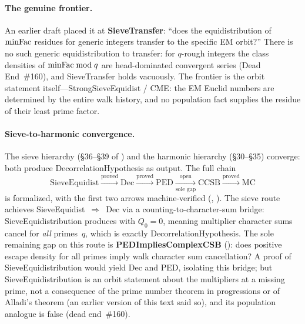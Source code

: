 \paragraph{The genuine frontier.}

An earlier draft placed it at \textbf{SieveTransfer}: ``does the
equidistribution of $\mathrm{minFac}$ residues for generic integers transfer
to the specific EM orbit?''  There is no such generic
equidistribution to transfer: for $q$-rough integers the class
densities of $\mathrm{minFac} \bmod q$ are head-dominated convergent series
(Dead End~\#160), and SieveTransfer holds vacuously.  The frontier is
the orbit statement itself---StrongSieveEquidist / CME: the EM Euclid
numbers are determined by the entire walk history, and no population
fact supplies the residue of their least prime factor.

\paragraph{Sieve-to-harmonic convergence.}

The sieve hierarchy (\S36--\S39 of )
and the harmonic hierarchy (\S30--\S35) converge: both produce
DecorrelationHypothesis as output.  The full chain
\[
\mathrm{SieveEquidist}
\xrightarrow{\text{proved}}
\mathrm{Dec}
\xrightarrow{\text{proved}}
\mathrm{PED}
\xrightarrow[\text{sole gap}]{\text{open}}
\mathrm{CCSB}
\xrightarrow{\text{proved}}
\mathrm{MC}
\]
is formalized, with the first two arrows machine-verified
(,
).
The sieve route achieves SieveEquidist~$\Rightarrow$~Dec via a
counting-to-character-sum bridge: SieveEquidistribution produces
 with $Q_0 = 0$, meaning multiplier character
sums cancel for \emph{all} primes~$q$, which is exactly
DecorrelationHypothesis.  The sole remaining gap on this route is
\textbf{PEDImpliesComplexCSB}
():
does positive escape density for all primes imply walk character sum
cancellation?  A proof of SieveEquidistribution would yield Dec and PED,
isolating this bridge; but SieveEquidistribution is an orbit statement about
the multipliers at a missing prime, not a consequence of the prime number
theorem in progressions or of Alladi's theorem (an earlier version of this
text said so), and its population analogue is false
(dead end~\#160).

